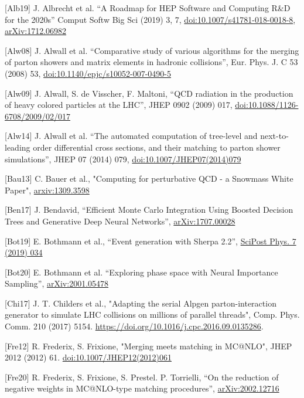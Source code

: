 \documentclass[11pt,a4paper]{article}
\begin{document}
{[}Alb19{]} J. Albrecht et al. ``A Roadmap for HEP Software and
Computing R\&D for the 2020s'' Comput Softw Big Sci (2019) 3, 7,
\href{https://doi.org/10.1007/s41781-018-0018-8}{{doi:10.1007/s41781-018-0018-8}},
\href{https://arxiv.org/abs/1712.06982}{{arXiv:1712.06982}}

{[}Alw08{]} J. Alwall et al. ``Comparative study of various algorithms
for the merging of parton showers and matrix elements in hadronic
collisions'', Eur. Phys. J. C 53 (2008) 53,
\href{https://doi.org/10.1140/epjc/s10052-007-0490-5}{{doi:10.1140/epjc/s10052-007-0490-5}}

{[}Alw09{]} J. Alwall, S. de Visscher, F. Maltoni, ``QCD radiation in
the production of heavy colored particles at the LHC'', JHEP 0902 (2009)
017,
\href{https://doi.org/10.1088/1126-6708/2009/02/017}{{doi:10.1088/1126-6708/2009/02/017}}

{[}Alw14{]} J. Alwall et al. ``The automated computation of tree-level
and next-to-leading order differential cross sections, and their
matching to parton shower simulations'', JHEP 07 (2014) 079,
\href{https://doi.org/10.1007/JHEP07(2014)079}{{doi:10.1007/JHEP07(2014)079}}

{[}Bau13{]} C. Bauer et al., "Computing for perturbative QCD - a
Snowmass White Paper",
\href{https://arxiv.org/abs/1309.3598}{{arxiv:1309.3598}}

{[}Ben17{]} J. Bendavid, ``Efficient Monte Carlo Integration Using
Boosted Decision Trees and Generative Deep Neural Networks'',
\href{https://arxiv.org/abs/1707.00028}{{arXiv:1707.00028}}

{[}Bot19{]} E. Bothmann et al., ``Event generation with Sherpa 2.2'',
\href{https://scipost.org/SciPostPhys.7.3.034}{{SciPost Phys. 7 (2019)
034}}

{[}Bot20{]} E. Bothmann et al. ``Exploring phase space with Neural
Importance Sampling'',
\href{https://arxiv.org/abs/2001.05478}{{arXiv:2001.05478}}

{[}Chi17{]} J. T. Childers et al., "Adapting the serial Alpgen
parton-interaction generator to simulate LHC collisions on millions of
parallel threads", Comp. Phys. Comm. 210 (2017) 5154.
\href{https://doi.org/10.1016/j.cpc.2016.09.0135286}{{https://doi.org/10.1016/j.cpc.2016.09.0135286}}.

{[}Fre12{]} R. Frederix, S. Frixione, "Merging meets matching in
MC@NLO", JHEP 2012 (2012) 61.
\href{https://doi.org/10.1007/JHEP12(2012)061}{{doi:10.1007/JHEP12(2012)061}}

{[}Fre20{]} R. Frederix, S. Frixione, S. Prestel. P. Torrielli, ``On the
reduction of negative weights in MC@NLO-type matching procedures'',
\href{https://arxiv.org/abs/2002.12716}{{arXiv:2002.12716}}
\end{document}

